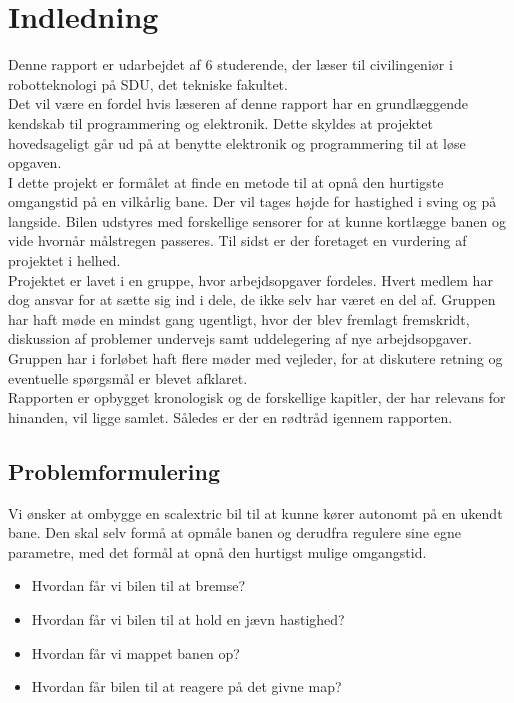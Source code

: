 \section{Indledning}

Denne rapport er udarbejdet af 6 studerende, der læser til civilingeniør i robotteknologi på SDU, det tekniske fakultet.\\

Det vil være en fordel hvis læseren af denne rapport har en grundlæggende kendskab til programmering og elektronik. Dette skyldes at projektet hovedsageligt går ud på at benytte elektronik og programmering til at løse opgaven.\\

I dette projekt er formålet at finde en metode til at opnå den hurtigste omgangstid på en vilkårlig bane. Der vil tages højde for hastighed i sving og på langside. Bilen udstyres med forskellige sensorer for at kunne kortlægge banen og vide hvornår målstregen passeres. Til sidst er der foretaget en vurdering af projektet i helhed.\\

Projektet er lavet i en gruppe, hvor arbejdsopgaver fordeles. Hvert medlem har dog ansvar for at sætte sig ind i dele, de ikke selv har været en del af. Gruppen har haft møde en mindst gang ugentligt, hvor der blev fremlagt fremskridt, diskussion af problemer undervejs samt uddelegering af nye arbejdsopgaver. Gruppen har i forløbet haft flere møder med vejleder, for at diskutere retning og eventuelle spørgsmål er blevet afklaret.\\

Rapporten er opbygget kronologisk og de forskellige kapitler, der har relevans for hinanden, vil ligge samlet. Således er der en rødtråd igennem rapporten.\\


\subsection{Problemformulering}

Vi ønsker at ombygge en scalextric bil til at kunne kører autonomt på en ukendt bane. Den skal selv formå at opmåle banen og derudfra regulere sine egne parametre, med det formål at opnå den hurtigst mulige omgangstid.
\begin{itemize}
	\item Hvordan får vi bilen til at bremse?
	\item Hvordan får vi bilen til at hold en jævn hastighed?
	\item Hvordan får vi mappet banen op?
	\item Hvordan får bilen til at reagere på det givne map?
\end{itemize}

